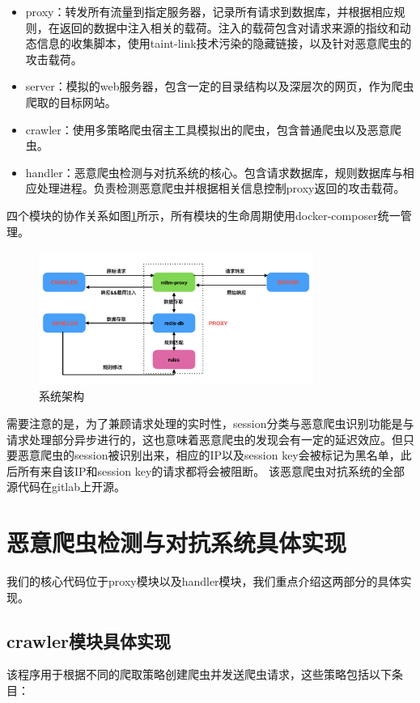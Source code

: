\documentclass[doctor,privacy,twoside]{buaa_mac}
\begin{document}
\begin{itemize}
\item[(1)] proxy：转发所有流量到指定服务器，记录所有请求到数据库，并根据相应规则，在返回的数据中注入相关的载荷。注入的载荷包含对请求来源的指纹和动态信息的收集脚本，使用taint-link技术污染的隐藏链接，以及针对恶意爬虫的攻击载荷。
\item[(2)] server：模拟的web服务器，包含一定的目录结构以及深层次的网页，作为爬虫爬取的目标网站。
\item[(3)] crawler：使用多策略爬虫宿主工具模拟出的爬虫，包含普通爬虫以及恶意爬虫。
\item[(4)] handler：恶意爬虫检测与对抗系统的核心。包含请求数据库，规则数据库与相应处理进程。负责检测恶意爬虫并根据相关信息控制proxy返回的攻击载荷。
\end{itemize}

四个模块的协作关系如图\ref{fig:architecture}所示，所有模块的生命周期使用docker-composer统一管理。

\begin{figure}[!h]
  \centering
  \includegraphics[width=0.8\textwidth]{images/architecture/architecture001.jpeg}
  \caption{系统架构}
  \label{fig:architecture}
\end{figure}


需要注意的是，为了兼顾请求处理的实时性，session分类与恶意爬虫识别功能是与请求处理部分异步进行的，这也意味着恶意爬虫的发现会有一定的延迟效应。但只要恶意爬虫的session被识别出来，相应的IP以及session key会被标记为黑名单，此后所有来自该IP和session key的请求都将会被阻断。
该恶意爬虫对抗系统的全部源代码在gitlab上开源。



\section{恶意爬虫检测与对抗系统具体实现}
我们的核心代码位于proxy模块以及handler模块，我们重点介绍这两部分的具体实现。

\subsection{crawler模块具体实现}
该程序用于根据不同的爬取策略创建爬虫并发送爬虫请求，这些策略包括以下条目：
\end{document}
